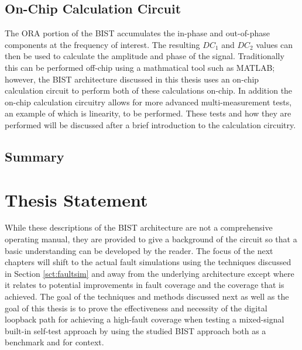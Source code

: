 \documentclass[12pt]{report}
\begin{document}
\subsection{On-Chip Calculation Circuit}
\label{sct:onchip}
The ORA portion of the BIST accumulates the in-phase and out-of-phase components at the frequency of interest.  The resulting $DC_1$ and $DC_2$ values can then be used to calculate the amplitude and phase of the signal.  Traditionally this can be performed off-chip using a mathmatical tool such as MATLAB; however, the BIST architecture discussed in this thesis uses an on-chip calculation circuit to perform both of these calculations on-chip.  In addition the on-chip calculation circuitry allows for more advanced multi-measurement tests, an example of which is linearity, to be performed\cite{joey}.  These tests and how they are performed will be discussed after a brief introduction to the calculation circuitry.

\subsection{Summary}

\section{Thesis Statement}
While these descriptions of the BIST architecture are not a comprehensive operating manual, they are provided to give a background of the circuit so that a basic understanding can be developed by the reader.  The focus of the next chapters will shift to the actual fault simulations using the techniques discussed in Section \ref{sct:faultsim} and away from the underlying architecture except where it relates to potential improvements in fault coverage and the coverage that is achieved.  The goal of the techniques and methods discussed next as well as the goal of this thesis is to prove the effectiveness and necessity of the digital loopback path for achieving a high-fault coverage when testing a mixed-signal built-in self-test approach by using the studied BIST approach both as a benchmark and for context.
 
\end{document}
